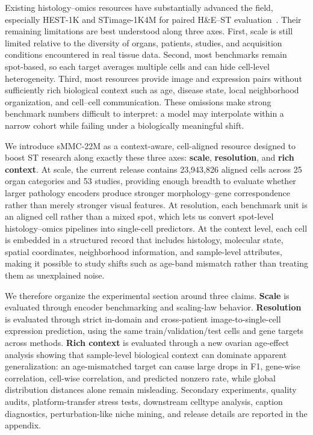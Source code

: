 \documentclass{article}
\newcommand{\dataset}{sMMC-22M\xspace}
\begin{document}
Existing histology--omics resources have substantially advanced the field, especially HEST-1K and STimage-1K4M for paired H\&E--ST evaluation~\cite{jaume2025hest,chen2024stimage}. Their remaining limitations are best understood along three axes. First, scale is still limited relative to the diversity of organs, patients, studies, and acquisition conditions encountered in real tissue data. Second, most benchmarks remain spot-based, so each target averages multiple cells and can hide cell-level heterogeneity. Third, most resources provide image and expression pairs without sufficiently rich biological context such as age, disease state, local neighborhood organization, and cell--cell communication. These omissions make strong benchmark numbers difficult to interpret: a model may interpolate within a narrow cohort while failing under a biologically meaningful shift.

We introduce \dataset as a context-aware, cell-aligned resource designed to boost ST research along exactly these three axes: \textbf{scale}, \textbf{resolution}, and \textbf{rich context}. At scale, the current release contains 23{,}943{,}826 aligned cells across 25 organ categories and 53 studies, providing enough breadth to evaluate whether larger pathology encoders produce stronger morphology--gene correspondence rather than merely stronger visual features. At resolution, each benchmark unit is an aligned cell rather than a mixed spot, which lets us convert spot-level histology--omics pipelines into single-cell predictors. At the context level, each cell is embedded in a structured record that includes histology, molecular state, spatial coordinates, neighborhood information, and sample-level attributes, making it possible to study shifts such as age-band mismatch rather than treating them as unexplained noise.

We therefore organize the experimental section around three claims. \textbf{Scale} is evaluated through encoder benchmarking and scaling-law behavior. \textbf{Resolution} is evaluated through strict in-domain and cross-patient image-to-single-cell expression prediction, using the same train/validation/test cells and gene targets across methods. \textbf{Rich context} is evaluated through a new ovarian age-effect analysis showing that sample-level biological context can dominate apparent generalization: an age-mismatched target can cause large drops in F1, gene-wise correlation, cell-wise correlation, and predicted nonzero rate, while global distribution distances alone remain misleading. Secondary experiments, quality audits, platform-transfer stress tests, downstream celltype analysis, caption diagnostics, perturbation-like niche mining, and release details are reported in the appendix.
\end{document}
